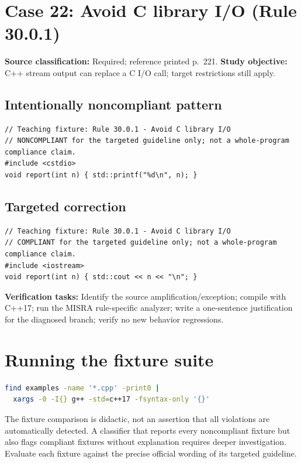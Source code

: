 \documentclass[10pt,letterpaper]{article}
\begin{document}
\section{Case 22: Avoid C library I/O (Rule 30.0.1)}
\textbf{Source classification:} Required; reference printed p.~221. \textbf{Study objective:} C++ stream output can replace a C I/O call; target restrictions still apply.
\subsection*{Intentionally noncompliant pattern}
\begin{lstlisting}
// Teaching fixture: Rule 30.0.1 - Avoid C library I/O
// NONCOMPLIANT for the targeted guideline only; not a whole-program compliance claim.
#include <cstdio>
void report(int n) { std::printf("%d\n", n); }
\end{lstlisting}
\subsection*{Targeted correction}
\begin{lstlisting}
// Teaching fixture: Rule 30.0.1 - Avoid C library I/O
// COMPLIANT for the targeted guideline only; not a whole-program compliance claim.
#include <iostream>
void report(int n) { std::cout << n << "\n"; }
\end{lstlisting}
\textbf{Verification tasks:} Identify the source amplification/exception; compile with C++17; run the MISRA rule-specific analyzer; write a one-sentence justification for the diagnosed branch; verify no new behavior regressions.

\section{Running the fixture suite}
\begin{lstlisting}[language=bash,caption={Syntax-check all fixtures, not a MISRA conformance test}]
find examples -name '*.cpp' -print0 |
  xargs -0 -I{} g++ -std=c++17 -fsyntax-only '{}'
\end{lstlisting}
The fixture comparison is didactic, not an assertion that all violations are automatically detected. A classifier that reports every noncompliant fixture but also flags compliant fixtures without explanation requires deeper investigation. Evaluate each fixture against the precise official wording of its targeted guideline.
\end{document}
